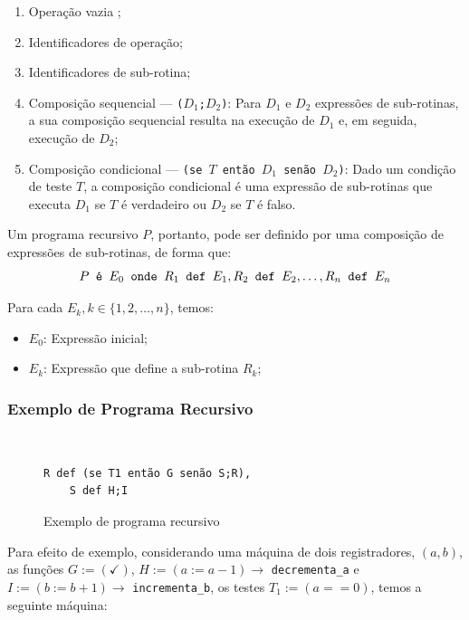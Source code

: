 \documentclass[12pt,fleqn]{article}
\begin{document}
\begin{enumerate}
    \item Operação vazia \checkmark;
    \item Identificadores de operação;
    \item Identificadores de sub-rotina;
    \item Composição sequencial --- \texttt{($D_1$;$D_2$)}: Para $D_1$ e $D_2$
    expressões de sub-rotinas, a sua composição sequencial resulta na execução
    de $D_1$ e, em seguida, execução de $D_2$;
    \item Composição condicional --- \texttt{(se $T$ então $D_1$ senão $D_2$)}:
    Dado um condição de teste $T$, a composição condicional é uma expressão de
    sub-rotinas que executa $D_1$ se $T$ é verdadeiro ou $D_2$ se $T$ é falso.
\end{enumerate}

Um programa recursivo $P$, portanto, pode ser definido por uma composição de
expressões de sub-rotinas, de forma que:
\[
    P \text{\tt\ é\ } E_0 \text{\tt\ onde\ } R_1 \text{\tt\ def\ } E_1, R_2
    \text{\tt\ def\ } E_2, \dots, R_n \text{\tt\ def\ } E_n
\]

Para cada $E_k, k \in \{1, 2, \dots, n\}$, temos:

\begin{itemize}
    \item $E_0$: Expressão inicial;
    \item $E_k$: Expressão que define a sub-rotina $R_k$;
\end{itemize}

\subsubsection{Exemplo de Programa Recursivo}
~
\begin{figure}[H]
\begin{Verbatim}[commandchars=\\\{\},codes={\catcode`\$=3\catcode`\^=7}]
    R def (se T1 então G senão S;R),
    S def H;I
\end{Verbatim}
\caption{Exemplo de programa recursivo}
\end{figure}

Para efeito de exemplo, considerando uma máquina de dois registradores, $(a,b)$,
as funções $G := (\checkmark)$, $H := (a := a-1) \rightarrow$
\verb|decrementa_a| e $I := (b := b+1) \rightarrow$ \verb|incrementa_b|, os
testes $T_1 := (a == 0)$, temos a seguinte máquina:
\end{document}
